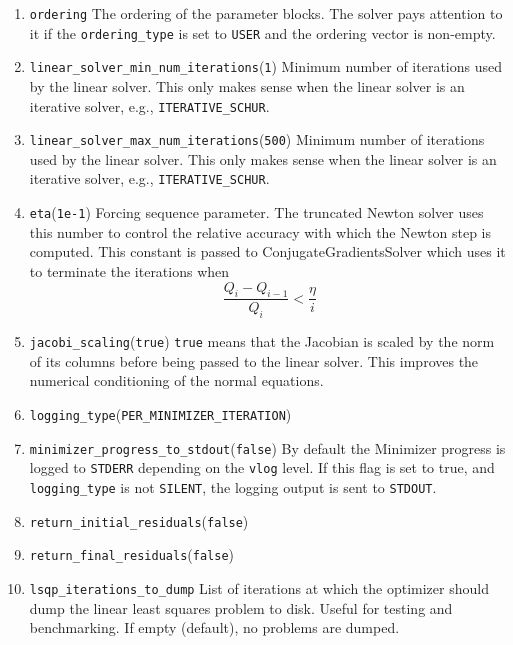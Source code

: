 \begin{enumerate}
\item{\texttt{ordering}} The ordering of the parameter blocks. The solver pays attention
    to it if the \texttt{ordering\_type} is set to \texttt{USER} and the ordering vector is
    non-empty.


\item{\texttt{linear\_solver\_min\_num\_iterations}}(\texttt{1}) Minimum number of iterations used by the linear solver. This only makes sense when the linear solver is an iterative solver, e.g., \texttt{ITERATIVE\_SCHUR}.

\item{\texttt{linear\_solver\_max\_num\_iterations}}(\texttt{500}) Minimum number of iterations used by the linear solver. This only makes sense when the linear solver is an iterative solver, e.g., \texttt{ITERATIVE\_SCHUR}.

\item{\texttt{eta}}(\texttt{1e-1})
 Forcing sequence parameter. The truncated Newton solver uses
    this number to control the relative accuracy with which the
     Newton step is computed. This constant is passed to ConjugateGradientsSolver which uses
     it to terminate the iterations when
\begin{equation}    
      \frac{Q_i - Q_{i-1}}{Q_i} < \frac{\eta}{i}
\end{equation}

\item{\texttt{jacobi\_scaling}}(\texttt{true}) \texttt{true} means that the Jacobian is scaled by the norm of its columns before being passed to the linear solver. This improves the numerical conditioning of the normal equations.

\item{\texttt{logging\_type}}(\texttt{PER\_MINIMIZER\_ITERATION})


\item{\texttt{minimizer\_progress\_to\_stdout}}(\texttt{false})
By default the Minimizer progress is logged to \texttt{STDERR} depending on the \texttt{vlog} level. If this flag is
set to true, and \texttt{logging\_type} is not \texttt{SILENT}, the logging output
is sent to \texttt{STDOUT}.

\item{\texttt{return\_initial\_residuals}}(\texttt{false})
\item{\texttt{return\_final\_residuals}}(\texttt{false})


\item{\texttt{lsqp\_iterations\_to\_dump}}
 List of iterations at which the optimizer should dump the
     linear least squares problem to disk. Useful for testing and
     benchmarking. If empty (default), no problems are dumped.


\end{enumerate}
